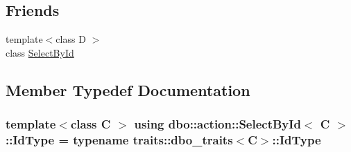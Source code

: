 \subsection*{Friends}
\begin{DoxyCompactItemize}
\item 
{\footnotesize template$<$class D $>$ }\\class \hyperlink{classdbo_1_1action_1_1_select_by_id_a9952e8f41a3fb1af7b01c5ed0892a551}{Select\+By\+Id}
\end{DoxyCompactItemize}


\subsection{Member Typedef Documentation}
\hypertarget{classdbo_1_1action_1_1_select_by_id_a00c65e230f8b64b90713042403032403}{
\subsubsection[{Id\+Type}]{\setlength{\rightskip}{0pt plus 5cm}template$<$class C $>$ using {\bf dbo\+::action\+::\+Select\+By\+Id}$<$ C $>$\+::{\bf Id\+Type} =  typename {\bf traits\+::dbo\+\_\+traits}$<$C$>$\+::{\bf Id\+Type}}}\label{classdbo_1_1action_1_1_select_by_id_a00c65e230f8b64b90713042403032403}


